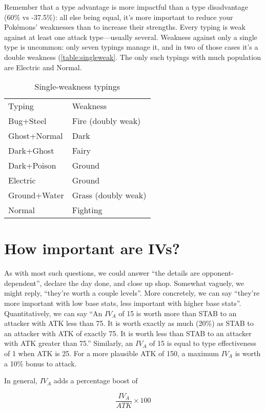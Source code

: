 Remember that a type advantage is more impactful than a type
  disadvantage (60\% vs -37.5\%):
  all else being equal, it's more important to reduce your Pokémons'
  weaknesses than to increase their strengths.
Every typing is weak against at least one attack type---usually several.
Weakness against only a single type is uncommon: only seven typings manage it, and in two
 of those cases it's a double weakness (\autoref{table:singleweak}.
The only such typings with much population are Electric and Normal. 
\begin{table}[ht]
\begin{center}
\begin{tabular}{ll}
Typing & Weakness\\
\Midrule
Bug+Steel & Fire (doubly weak) \\
Ghost+Normal & Dark \\
Dark+Ghost & Fairy \\
Dark+Poison & Ground \\
Electric & Ground \\
Ground+Water & Grass (doubly weak) \\
Normal & Fighting \\
\end{tabular}
\end{center}
\caption{Single-weakness typings}
\label{table:singleweak}
\end{table}

\section{How important are IVs?}
As with most such questions, we could answer ``the details are opponent-dependent'',
  declare the day done, and close up shop.
Somewhat vaguely, we might reply, ``they're worth a couple levels''.
More concretely, we can say ``they're more important with low base stats, less important
  with higher base stats''.
Quantitatively, we can say ``An $IV_A$ of 15 is worth more than STAB to an
  attacker with ATK less than 75. It is worth exactly as much (20\%) as STAB
  to an attacker with ATK of exactly 75. It is worth less than STAB
  to an attacker with ATK greater than 75.''
Similarly, an $IV_A$ of 15 is equal to type effectiveness of 1 when ATK is 25.
For a more plausible ATK of 150, a maximum $IV_A$ is worth a 10\% bonus to attack.

In general, $IV_A$ adds a percentage boost of

\[ \frac{IV_A}{ATK} \times 100 \]


